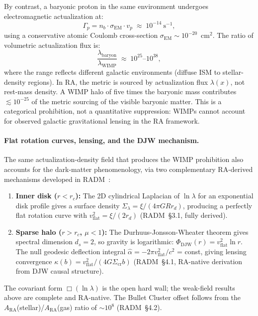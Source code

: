 \documentclass[11pt,a4paper]{article}
\theoremstyle{plain}
\theoremstyle{definition}
\theoremstyle{remark}
\begin{document}
By contrast, a baryonic proton in the same environment undergoes electromagnetic
actualization at:
\begin{equation}
  \Gamma_p = n_b \cdot \sigma_{\mathrm{EM}} \cdot v_p
  \;\approx\; 10^{-14}~\text{s}^{-1},
  \label{eq:proton_rate}
\end{equation}
using a conservative atomic Coulomb cross-section $\sigma_{\mathrm{EM}} \sim
10^{-20}$~cm$^2$. The ratio of volumetric actualization flux is:
\begin{equation}
  \frac{\lambda_{\mathrm{baryon}}}{\lambda_{\mathrm{WIMP}}}
  \;\approx\; 10^{25}\text{--}10^{38},
  \label{eq:flux_ratio}
\end{equation}
where the range reflects different galactic environments (diffuse ISM to
stellar-density regions). In RA, the metric is sourced by actualization flux
$\lambda(x)$, not rest-mass density. A WIMP halo of five times the baryonic mass
contributes $\lesssim 10^{-25}$ of the metric sourcing of the visible baryonic
matter. This is a categorical prohibition, not a quantitative suppression: WIMPs
cannot account for observed galactic gravitational lensing in the RA framework.

\paragraph{Flat rotation curves, lensing, and the DJW mechanism.}
The same actualization-density field that produces the WIMP prohibition also
accounts for the dark-matter phenomenology, via two complementary RA-derived
mechanisms developed in RADM~\citep{Sandeman2026RADM}:
\begin{enumerate}[noitemsep]
  \item \textbf{Inner disk ($r < r_c$):} The 2D cylindrical Laplacian of
  $\ln\lambda$ for an exponential disk profile gives a surface density
  $\Sigma_\lambda = \xi/(4\pi G R r_d)$, producing a perfectly flat rotation
  curve with $v_\mathrm{flat}^2 = \xi/(2r_d)$ (RADM~\S3.1, fully derived).
  \item \textbf{Sparse halo ($r > r_c$, $\mu < 1$):} The Durhuus-Jonsson-Wheater
  theorem gives spectral dimension $d_s = 2$, so gravity is logarithmic:
  $\Phi_\mathrm{DJW}(r) = v_\mathrm{flat}^2\ln r$. The null geodesic
  deflection integral $\hat\alpha = -2\pi v_\mathrm{flat}^2/c^2$ = const,
  giving lensing convergence $\kappa(b) = v_\mathrm{flat}^2/(4G\Sigma_\mathrm{cr}b)$
  (RADM~\S4.1, RA-native derivation from DJW causal structure).
\end{enumerate}
The covariant form $\Box(\ln\lambda)$ is the open hard wall; the weak-field
results above are complete and RA-native. The Bullet Cluster offset follows
from the $A_\mathrm{RA}$(stellar)/$ A_\mathrm{RA}$(gas) ratio of $\sim 10^8$
(RADM~\S4.2).
\end{document}
